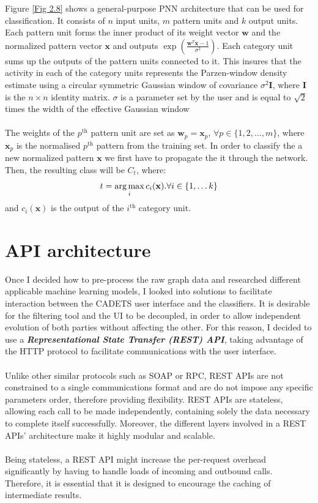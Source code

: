	 Figure \ref{Fig 2.8} shows a general-purpose PNN architecture that can be used for classification. It consists of $n$ input units, $m$ pattern units and $k$ output units. Each pattern unit forms the inner product of its weight vector $\mathbf{w}$ and the normalized pattern vector $\mathbf{x}$ and outputs $\exp(\frac{\mathbf{w}^T\mathbf{x} - 1}{\sigma^2})$. Each category unit sums up the outputs of the pattern units connected to it. This insures that the activity in each of the category units represents the Parzen-window density estimate using a circular symmetric Gaussian window of covariance $\sigma^2\mathbf{I}$, where $\mathbf{I}$ is the $n\times n$ identity matrix. $\sigma$ is a parameter set by the user and is equal to $\sqrt{2}$ times the width of the effective Gaussian window
     \\ \\ 
	 The weights of the $p^\text{th}$ pattern unit are set as $\mathbf{w}_p = \mathbf{x}_p$, $\forall p \in \{ 1,2,\dots ,m \}$, where $\mathbf{x}_p$ is the normalised $p^\text{th}$ pattern from the training set. In order to classify the a new normalized pattern $\mathbf{x}$ we first have to propagate the it through the network. Then, the resulting class will be $C_t$, where:
	 \begin{equation}
		 t = \operatorname*{arg\,max}_i c_i(\mathbf{x}). \forall i \in \{1,\dots k\}
	 \end{equation}
	 and $c_i(\mathbf{x})$ is the output of the $i^\text{th}$ category unit.
	\section{API architecture} \label{Section 2.3}
	Once I decided how to pre-process the raw graph data and researched different applicable machine learning models, I looked into solutions to facilitate interaction between the CADETS user interface and the classifiers. It is desirable for the filtering tool and the UI to be decoupled, in order to allow independent evolution of both parties without affecting the other. For this reason, I decided to use a \textit{\textbf{Representational State Transfer (REST) API}}, taking advantage of the HTTP protocol to facilitate communications with the user interface.
	\\ \\
	Unlike other similar protocols such as SOAP or RPC, REST APIs are not constrained to a single communications format and are do not impose any specific parameters order, therefore providing flexibility. REST APIs are stateless, allowing each call to be made independently, containing solely the data necessary to complete itself successfully. Moreover, the different layers involved in a REST APIs' architecture make it highly modular and scalable. 
	\\ \\
	Being stateless, a REST API might increase the per-request overhead significantly by having to handle loads of incoming and outbound calls. Therefore, it is essential that it is designed to encourage the caching of intermediate results.
	
